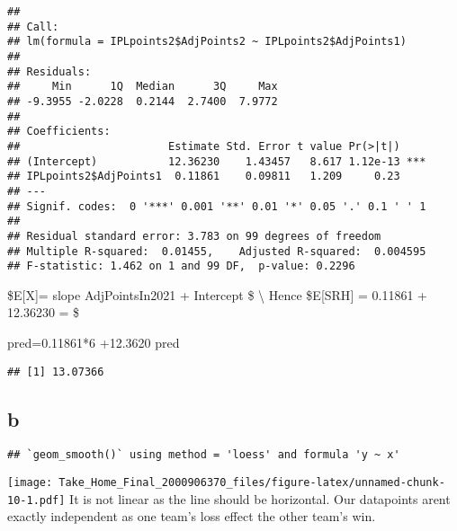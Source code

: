 \documentclass[
]{article}
\newenvironment{Shaded}{\begin{snugshade}}{\end{snugshade}}
\newcommand{\DecValTok}[1]{\textcolor[rgb]{0.00,0.00,0.81}{#1}}
\newcommand{\FloatTok}[1]{\textcolor[rgb]{0.00,0.00,0.81}{#1}}
\newcommand{\FunctionTok}[1]{\textcolor[rgb]{0.00,0.00,0.00}{#1}}
\newcommand{\NormalTok}[1]{#1}
\newcommand{\OtherTok}[1]{\textcolor[rgb]{0.56,0.35,0.01}{#1}}
\newcommand{\SpecialCharTok}[1]{\textcolor[rgb]{0.00,0.00,0.00}{#1}}
\begin{document}
\begin{verbatim}
## 
## Call:
## lm(formula = IPLpoints2$AdjPoints2 ~ IPLpoints2$AdjPoints1)
## 
## Residuals:
##     Min      1Q  Median      3Q     Max 
## -9.3955 -2.0228  0.2144  2.7400  7.9772 
## 
## Coefficients:
##                       Estimate Std. Error t value Pr(>|t|)    
## (Intercept)           12.36230    1.43457   8.617 1.12e-13 ***
## IPLpoints2$AdjPoints1  0.11861    0.09811   1.209     0.23    
## ---
## Signif. codes:  0 '***' 0.001 '**' 0.01 '*' 0.05 '.' 0.1 ' ' 1
## 
## Residual standard error: 3.783 on 99 degrees of freedom
## Multiple R-squared:  0.01455,    Adjusted R-squared:  0.004595 
## F-statistic: 1.462 on 1 and 99 DF,  p-value: 0.2296
\end{verbatim}

\$E{[}X{]}= slope \times AdjPointsIn2021 + Intercept \$ \textbackslash{}
Hence \$E{[}SRH{]} = 0.11861  + 12.36230 = \$

\begin{Shaded}
\begin{Highlighting}[]
\NormalTok{pred}\OtherTok{=}\FloatTok{0.11861}\SpecialCharTok{*}\DecValTok{6} \SpecialCharTok{+}\FloatTok{12.3620}
\NormalTok{pred}
\end{Highlighting}
\end{Shaded}

\begin{verbatim}
## [1] 13.07366
\end{verbatim}

\hypertarget{b-1}{%
\subsection{b}\label{b-1}}

\begin{Shaded}
\end{Shaded}

\begin{verbatim}
## `geom_smooth()` using method = 'loess' and formula 'y ~ x'
\end{verbatim}

\texttt{[image: Take\_Home\_Final\_2000906370\_files/figure-latex/unnamed-chunk-10-1.pdf]}
It is not linear as the line should be horizontal. Our datapoints arent
exactly independent as one team's loss effect the other team's win.
\end{document}

